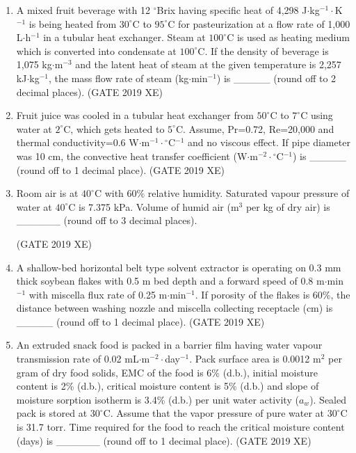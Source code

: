 \documentclass[journal,12pt,onecolumn]{IEEEtran}
\begin{document}
\begin{enumerate}
\item A mixed fruit beverage with 12 $^\circ$Brix having specific heat of 4,298 J$\cdot$kg$^{-1}\cdot$K$^{-1}$ is being heated from $30^\circ$C to $95^\circ$C for pasteurization at a flow rate of 1,000 L$\cdot$h$^{-1}$ in a tubular heat exchanger. Steam at $100^\circ$C is used as heating medium which is converted into condensate at $100^\circ$C. If the density of beverage is 1,075 kg$\cdot$m$^{-3}$ and the latent heat of steam at the given temperature is 2,257 kJ$\cdot$kg$^{-1}$, the mass flow rate of steam (kg$\cdot$min$^{-1}$) is \_\_\_\_\_ (round off to 2 decimal places).
\hfill{(GATE 2019 XE)} \\


\item Fruit juice was cooled in a tubular heat exchanger from $50^\circ$C to $7^\circ$C using water at $2^\circ$C, which gets heated to $5^\circ$C. Assume, Pr=0.72, Re=20,000 and thermal conductivity=0.6 W$\cdot$m$^{-1}\cdot{}^\circ$C$^{-1}$ and no viscous effect. If pipe diameter was 10 cm, the convective heat transfer coefficient (W$\cdot$m$^{-2}\cdot{}^\circ$C$^{-1}$) is \_\_\_\_\_ (round off to 1 decimal place).
\hfill{(GATE 2019 XE)} \\


\item Room air is at $40^\circ$C with 60\% relative humidity. Saturated vapour pressure of water at $40^\circ$C is 7.375 kPa. Volume of humid air (m$^{3}$ per kg of dry air) is \_\_\_\_\_\_ (round off to 3 decimal places).

\hfill{(GATE 2019 XE)} \\

\item A shallow-bed horizontal belt type solvent extractor is operating on 0.3 mm thick soybean flakes with 0.5 m bed depth and a forward speed of 0.8 m$\cdot$min$^{-1}$ with miscella flux rate of 0.25 m$\cdot$min$^{-1}$. If porosity of the flakes is 60\%, the distance between washing nozzle and miscella collecting receptacle (cm) is \_\_\_\_\_ (round off to 1 decimal place).
\hfill{(GATE 2019 XE)} \\


\item An extruded snack food is packed in a barrier film having water vapour transmission rate of 0.02 mL$\cdot$m$^{-2}\cdot$day$^{-1}$. Pack surface area is 0.0012 m$^{2}$ per gram of dry food solids, EMC of the food is 6\% (d.b.), initial moisture content is 2\% (d.b.), critical moisture content is 5\% (d.b.) and slope of moisture sorption isotherm is 3.4\% (d.b.) per unit water activity ($a_w$). Sealed pack is stored at $30^\circ$C. Assume that the vapor pressure of pure water at $30^\circ$C is 31.7 torr. Time required for the food to reach the critical moisture content (days) is \_\_\_\_\_\_ (round off to 1 decimal place).
\hfill{(GATE 2019 XE)} \\



\end{enumerate}
\end{document}
